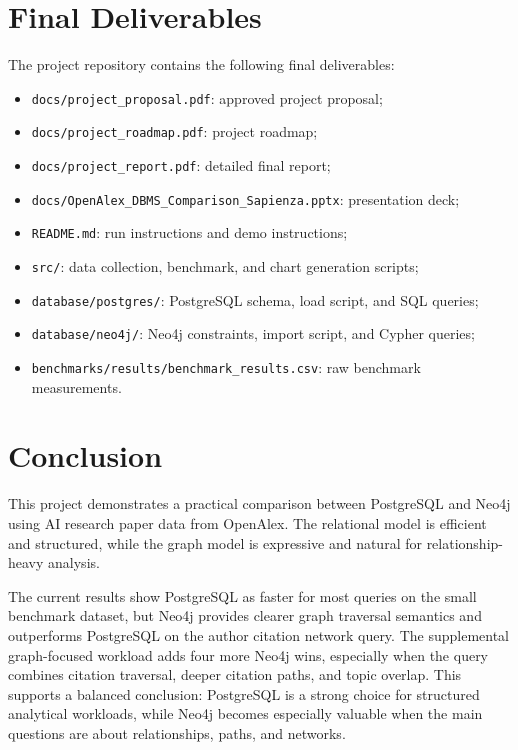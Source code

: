 \documentclass[11pt]{article}
\begin{document}
\section{Final Deliverables}

The project repository contains the following final deliverables:

\begin{itemize}
    \item \texttt{docs/project\_proposal.pdf}: approved project proposal;
    \item \texttt{docs/project\_roadmap.pdf}: project roadmap;
    \item \texttt{docs/project\_report.pdf}: detailed final report;
    \item \texttt{docs/OpenAlex\_DBMS\_Comparison\_Sapienza.pptx}: presentation deck;
    \item \texttt{README.md}: run instructions and demo instructions;
    \item \texttt{src/}: data collection, benchmark, and chart generation scripts;
    \item \texttt{database/postgres/}: PostgreSQL schema, load script, and SQL queries;
    \item \texttt{database/neo4j/}: Neo4j constraints, import script, and Cypher queries;
    \item \texttt{benchmarks/results/benchmark\_results.csv}: raw benchmark measurements.
\end{itemize}

\section{Conclusion}

This project demonstrates a practical comparison between PostgreSQL and Neo4j using AI research paper data from OpenAlex.
The relational model is efficient and structured, while the graph model is expressive and natural for relationship-heavy analysis.

The current results show PostgreSQL as faster for most queries on the small benchmark dataset, but Neo4j provides clearer graph traversal semantics and outperforms PostgreSQL on the author citation network query.
The supplemental graph-focused workload adds four more Neo4j wins, especially when the query combines citation traversal, deeper citation paths, and topic overlap.
This supports a balanced conclusion: PostgreSQL is a strong choice for structured analytical workloads, while Neo4j becomes especially valuable when the main questions are about relationships, paths, and networks.
\end{document}
